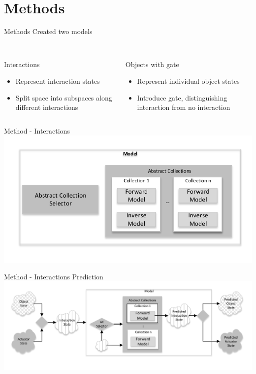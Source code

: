\documentclass{beamer}
\begin{document}
\section{Methods}
\begin{frame}{Methods}
 Created two models \\~\\
\begin{columns}
\begin{column}[t]{.50\textwidth}
Interactions
\begin{itemize}
\item Represent interaction states
\item Split space into subspaces along different interactions
\end{itemize}
\end{column}
\begin{column}[t]{.50\textwidth}
Objects with gate
\begin{itemize}
\item Represent individual object states
\item Introduce gate, distinguishing interaction from no interaction
\end{itemize}
\end{column}
\end{columns}
\end{frame}

\begin{frame}{Method - Interactions}
\includegraphics[width=\textwidth]{PairwiseOverview.pdf}
\end{frame}

\begin{frame}{Method - Interactions Prediction}
\includegraphics[width=\textwidth]{PairwisePrediction.pdf}
\end{frame}
\end{document}
